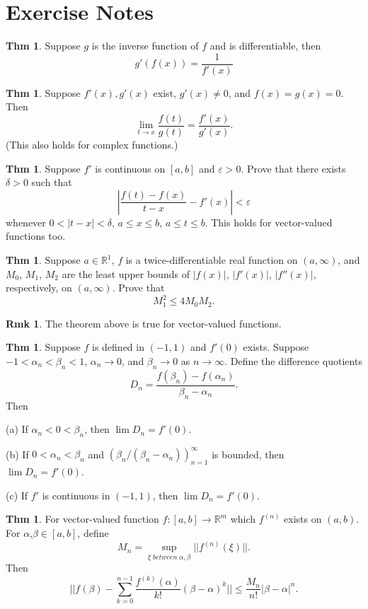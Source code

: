 \documentclass{article}
\theoremstyle{definition}
\newtheorem{theorem}[definition]{Thm}
\newtheorem{remarks}[definition]{Rmk}
\begin{document}
\section{Exercise Notes}
\begin{theorem}
    Suppose $g$ is the inverse function of $f$ and is differentiable, then
    \[
    g'(f(x)) = \frac{1}{f'(x)}
    \]
\end{theorem}
\begin{theorem}
    Suppose $f'(x), g'(x)$ exist, $g'(x)\neq0$, and $f(x)=g(x)=0$. Then
    \[
    \lim_{t\to x} \frac{f(t)}{g(t)} = \frac{f'(x)}{g'(x)}.
    \]
    (This also holds for complex functions.)
\end{theorem}
\begin{theorem}
    Suppose $f'$ is continuous on $[a,b]$ and $\varepsilon>0$. Prove that there exists $\delta>0$ such that
    \[
    |\frac{f(t)-f(x)}{t-x}-f'(x)|<\varepsilon
    \]
    whenever $0<|t-x|<\delta$, $a\leq x\leq b$, $a\leq t\leq b$. This holds for vector-valued functions too.
\end{theorem}
\begin{theorem}
    Suppose $a\in \mathbb{R}^1$, $f$ is a twice-differentiable real function on $(a, \infty)$, and $M_0$, $M_1$, $M_2$ are the least upper bounds of $|f(x)|$, $|f'(x)|$, $|f''(x)|$, respectively, on $(a, \infty)$. Prove that
    \[
    M_1^2\leq 4M_0M_2.
    \]
\end{theorem}
\begin{remarks}
    The theorem above is true for vector-valued functions.
\end{remarks}
\begin{theorem}
    Suppose $f$ is defined in $(-1, 1)$ and $f'(0)$ exists. Suppose $-1<\alpha_n<\beta_n<1$, $\alpha_n\to0$, and $\beta_n\to0$ as $n\to\infty$. Define the difference quotients
    \[
    D_n=\frac{f(\beta_n)-f(\alpha_n)}{\beta_n-\alpha_n}.
    \]
    Then\par
    (a) If $\alpha_n<0<\beta_n$, then $\lim D_n=f'(0)$.\par
    (b) If $0<\alpha_n<\beta_n$ and $(\beta_n/(\beta_n-\alpha_n))_{n=1}^\infty$ is bounded, then $\lim D_n=f'(0)$.\par
    (c) If $f'$ is continuous in $(-1,1)$, then $\lim D_n=f'(0)$.
\end{theorem}
\begin{theorem}
    For vector-valued function $f:[a,b]\to\mathbb{R}^m$ which $f^{(n)}$ exists on $(a,b)$. For $\alpha$,$\beta\in [a,b]$, define
    \[
    M_n = \sup_{\xi\;between\;\alpha,\beta}||f^{(n)}(\xi)||.
    \]
    Then
    \[
    ||f(\beta)-\sum_{k=0}^{n-1}\frac{f^{(k)}(\alpha)}{k!}(\beta-\alpha)^k||\leq \frac{M_n}{n!}|\beta-\alpha|^n.
    \]
\end{theorem}
\end{document}
